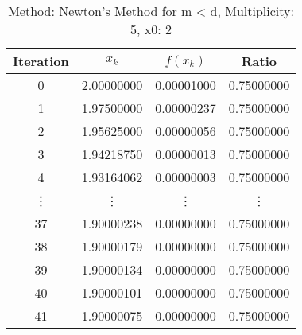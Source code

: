 \begin{table}
\centering
\caption{Method: Newton's Method for m < d, Multiplicity: 5, x0: 2}
\label{tab:table_Newton's_Method_for_m_<_d_5_2}
\begin{tabular}{c c c c}
\toprule
Iteration &      $x_k$ &   $f(x_k)$ &      Ratio \\
\midrule
        0 & 2.00000000 & 0.00001000 & 0.75000000 \\
        1 & 1.97500000 & 0.00000237 & 0.75000000 \\
        2 & 1.95625000 & 0.00000056 & 0.75000000 \\
        3 & 1.94218750 & 0.00000013 & 0.75000000 \\
        4 & 1.93164062 & 0.00000003 & 0.75000000 \\
   \vdots &     \vdots &     \vdots &     \vdots \\
       37 & 1.90000238 & 0.00000000 & 0.75000000 \\
       38 & 1.90000179 & 0.00000000 & 0.75000000 \\
       39 & 1.90000134 & 0.00000000 & 0.75000000 \\
       40 & 1.90000101 & 0.00000000 & 0.75000000 \\
       41 & 1.90000075 & 0.00000000 & 0.75000000 \\
\bottomrule
\end{tabular}
\end{table}
